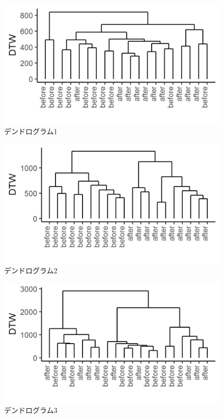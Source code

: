 \documentclass{jarticle}
\begin{document}
\begin{figure}[H]
	\begin{center}
		\includegraphics[width=15cm]{fig/dendro_1.png}
		\caption{デンドログラム1}
		\label{fig:dendro1}
	\end{center}
\end{figure}
\begin{figure}[H]
	\begin{center}
		\includegraphics[width=15cm]{fig/dendro_2.png}
		\caption{デンドログラム2}
		\label{fig:dendro2}
	\end{center}
\end{figure}
\begin{figure}[H]
	\begin{center}
		\includegraphics[width=15cm]{fig/dendro_3.png}
		\caption{デンドログラム3}
		\label{fig:dendro3}
	\end{center}
\end{figure}
\end{document}
